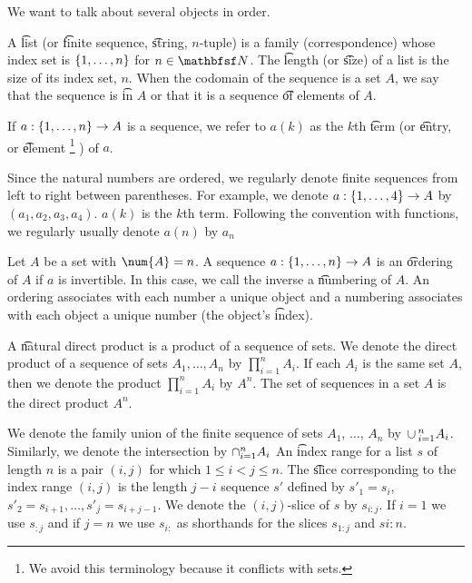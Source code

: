 
We want to talk about several objects in order.


A \t{list} (or \t{finite sequence}, \t{string}, \t{$n$-tuple}) is a family (correspondence) whose index set is $\{1, \dots, n\}$ for $n \in \N$.
The \t{length} (or \t{size}) of a list is the size of its index set, $n$.
When the codomain of the sequence is a set $A$, we say that the sequence is \t{in} $A$ or that it is a sequence \t{of} elements of $A$.

If $a: \{1, \dots, n\} \to A$ is a sequence, we refer to $a(k)$ as the $k$th \t{term} (or \t{entry}, or \t{element}
  \ifhmode\unskip\fi\footnote{
We avoid this terminology because it conflicts with sets.
  }
) of $a$.


Since the natural numbers are ordered, we regularly denote finite sequences from left to right between parentheses.
For example, we denote $a: \{1, \dots, 4\} \to A$ by $(a_1, a_2, a_3, a_4)$.
$a(k)$ is the $k$th term.
Following the convention with functions, we regularly usually denote $a(n)$ by $a_n$

Let $A$ be a set with $\num{A} = n$.
A sequence $a: \{1, \dots, n\} \to A$ is an \t{ordering} of $A$ if $a$ is invertible.
In this case, we call the inverse a \t{numbering} of $A$.
An ordering associates with each number a unique object and a numbering associates with each object a unique number (the object's \t{index}).


A \t{natural direct product} is a product of a sequence of sets.
We denote the direct product of a sequence of sets $A_1, \dots, A_n$ by $\prod_{i = 1}^{n} A_i$.
If each $A_i$ is the same set $A$, then we denote the product $\prod_{i = 1}^{n} A_i$ by $A^n$.
The set of sequences in a set $A$ is the direct product $A^n$.

We denote the family union of the finite sequence of sets $A_1$, $\dots$, $A_n$ by $\,\cup\,_{i = 1}^{n} A_i$.
Similarly, we denote the intersection by $\cap_{i = 1}^{n} A_i$
An \t{index range} for a list $s$ of length $n$ is a pair $(i, j)$ for which $1 \leq i < j \leq n$.
The \t{slice} corresponding to the index range $(i,j)$ is the length $j-i$ sequence $s'$ defined by $s'_1 = s_{i}$, $s'_2 = s_{i+1}, \dots, s'_{j} = s_{i + j-1}$.
We denote the $(i,j)$-slice of $s$ by $s_{i:j}$.
If $i = 1$ we use $s_{:j}$ and if $j = n$ we use $s_{i:}$ as shorthands for the slices $s_{1:j}$ and $s{i:n}$.
